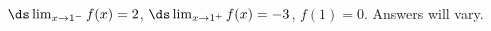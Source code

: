 {$\ds \lim_{x\to 1^-} f(x)=2$, \quad $\ds \lim_{x\to 1^+} f(x)=-3$, \quad $f(1)=0$.}
{Answers will vary.}
